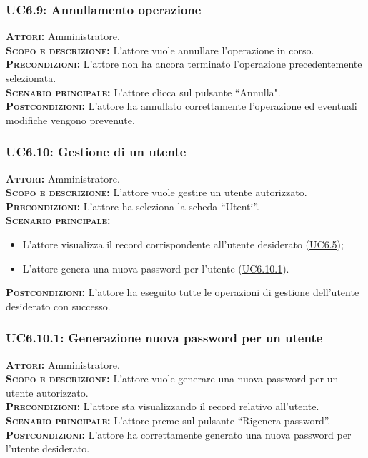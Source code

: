 \subsubsection{UC6.9: Annullamento operazione}
\label{sec:UC69}
\textsc{\textbf{Attori:}} Amministratore.\\
\textsc{\textbf{Scopo e descrizione:}} L'attore vuole annullare l'operazione in corso.\\
\textsc{\textsc{\textbf{Precondizioni:}}} L'attore non ha ancora terminato l'operazione precedentemente selezionata.\\
\textsc{\textbf{Scenario principale:}} L'attore clicca sul pulsante ``Annulla".\\
\textsc{\textbf{Postcondizioni:}} L'attore ha annullato correttamente l'operazione ed eventuali modifiche vengono prevenute.

\subsubsection{UC6.10: Gestione di un utente}
\label{sec:UC610}
\textsc{\textbf{Attori:}} Amministratore.\\
\textsc{\textbf{Scopo e descrizione:}} L'attore vuole gestire un utente autorizzato.\\
\textsc{\textsc{\textbf{Precondizioni:}}} L'attore ha seleziona la scheda ``Utenti''.\\
\textsc{\textbf{Scenario principale:}} 
\begin{itemize}
    \item L'attore visualizza il record corrispondente all'utente desiderato (\hyperref[sec:UC65]{UC6.5});
    \item L'attore genera una nuova password per l'utente (\hyperref[sec:UC6101]{UC6.10.1}).
\end{itemize}
\textsc{\textbf{Postcondizioni:}} L'attore ha eseguito tutte le operazioni di gestione dell'utente desiderato con successo.

\subsubsection{UC6.10.1: Generazione nuova password per un utente}
\label{sec:UC6101}
\textsc{\textbf{Attori:}} Amministratore.\\
\textsc{\textbf{Scopo e descrizione:}} L'attore vuole generare una nuova password per un utente autorizzato.\\
\textsc{\textsc{\textbf{Precondizioni:}}} L'attore sta visualizzando il record relativo all'utente.\\
\textsc{\textbf{Scenario principale:}} L'attore preme sul pulsante ``Rigenera password''.\\
\textsc{\textbf{Postcondizioni:}} L'attore ha correttamente generato una nuova password per l'utente desiderato.

